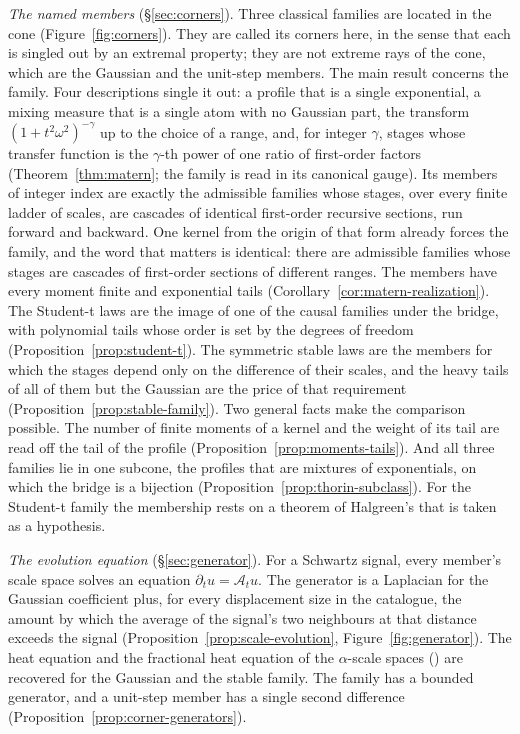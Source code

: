 \emph{The named members} (\S\ref{sec:corners}). Three classical families are located in the
cone (Figure~\ref{fig:corners}). They are called its corners here, in the sense that each is
singled out by an extremal property; they are not extreme rays of the cone, which are the
Gaussian and the unit-step members. The main result concerns the \Matern{} family. Four
descriptions single it out: a profile that is a single exponential, a mixing measure that is a
single atom with no Gaussian part, the transform $(1+t^2\omega^2)^{-\gamma}$ up to the choice of a range, and, for
integer $\gamma$, stages whose transfer function is the $\gamma$-th power of one ratio of
first-order factors (Theorem~\ref{thm:matern}; the family is read in its canonical gauge). Its
members of integer index are exactly the admissible families whose stages, over every finite
ladder of scales, are cascades of identical first-order recursive sections, run forward and
backward. One kernel from the origin of that form already forces the family, and the word
that matters is identical: there are admissible families whose stages are cascades of
first-order sections of different ranges. The \Matern{} members have every moment finite and
exponential tails (Corollary~\ref{cor:matern-realization}). The Student-t laws are the image of
one of the causal families under the bridge, with polynomial tails whose order is set by the
degrees of freedom (Proposition~\ref{prop:student-t}). The symmetric stable laws are the
members for which the stages depend only on the difference of their scales, and the heavy
tails of all of them but the Gaussian are the price of that requirement
(Proposition~\ref{prop:stable-family}). Two general
facts make the comparison possible. The number of finite moments of a kernel and the weight
of its tail are read off the tail of the profile (Proposition~\ref{prop:moments-tails}). And
all three families lie in one subcone, the profiles that are mixtures of exponentials, on
which the bridge is a bijection (Proposition~\ref{prop:thorin-subclass}). For the Student-t
family the membership rests on a theorem of Halgreen's that is taken as a hypothesis.

\emph{The evolution equation} (\S\ref{sec:generator}). For a Schwartz signal, every member's
scale space solves an equation $\partial_t u = \mathcal{A}_t u$. The generator is a Laplacian
for the Gaussian coefficient plus, for every displacement size in the catalogue, the amount by
which the average of the signal's two neighbours at that distance exceeds the signal
(Proposition~\ref{prop:scale-evolution}, Figure~\ref{fig:generator}). The heat equation and
the fractional heat equation of the $\alpha$-scale spaces () are
recovered for the Gaussian and the stable family. The \Matern{} family has a bounded generator, and a unit-step member has a
single second difference (Proposition~\ref{prop:corner-generators}).

